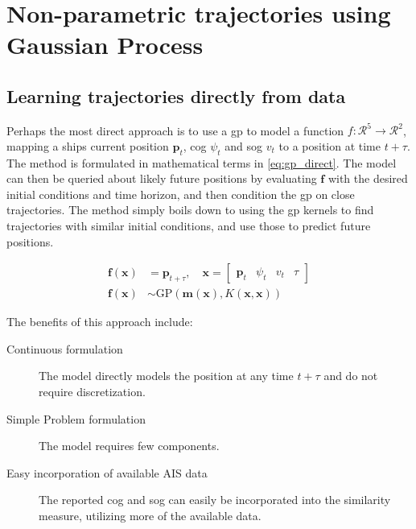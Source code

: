 \chapter{Non-parametric trajectories using Gaussian Process}\label{chap:impl}

\section{Learning trajectories directly from data}
Perhaps the most direct approach is to use a \acrshort{gp} to model a function $f: \mathcal{R}^5 \to \mathcal{R}^2$, mapping a ships current position $\boldsymbol{p}_t$, \acrshort{cog} $\psi_t$ and \acrshort{sog} $v_t$ to a position at time $t+\tau$. The method is formulated in mathematical terms in \cref{eq:gp_direct}. The model can then be queried about likely future positions by evaluating $\boldsymbol{f}$ with the desired initial conditions and time horizon, and then condition the \acrshort{gp} on close trajectories. 
The method simply boils down to using the \acrshort{gp} kernels to find trajectories with similar initial conditions, and use those to predict future positions.

\begin{subequations}\label{eq:gp_direct}
\begin{align}
    \boldsymbol{f}(\boldsymbol{x}) &= \boldsymbol{p}_{t+\tau} \label{eq:gp_direct_f}, \quad \boldsymbol{x} = \begin{bmatrix} \boldsymbol{p}_t & \psi_t & v_t & \tau\end{bmatrix}\\
    \boldsymbol{f}(\boldsymbol{x}) &\sim \text{GP}(\boldsymbol{m}(\boldsymbol{x}), K(\boldsymbol{x}, \boldsymbol{x}))\label{eq:gp_direct_f_dist}
\end{align} 
\end{subequations}

The benefits of this approach include:
\begin{description}
    \item[Continuous formulation] The model directly models the position at any time $t+\tau$ and do not require discretization. 
    \item[Simple Problem formulation] The model requires few components.
    \item[Easy incorporation of available AIS data] The reported \acrshort{cog} and \acrshort{sog} can easily be incorporated into the similarity measure, utilizing more of the available data.
\end{description}

